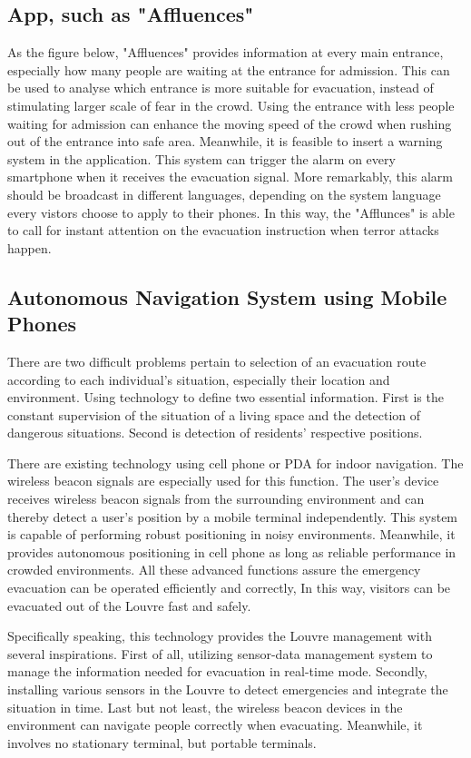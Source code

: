 \documentclass{mcmthesis}
\begin{document}
\subsection{App, such as "Affluences"}
		As the figure below, "Affluences" provides information at every main entrance, especially how many people are waiting at the entrance for admission.  This can be used to analyse which entrance is more suitable for evacuation, instead of stimulating larger scale of fear in the crowd. Using the entrance with less people waiting for admission can enhance the moving speed of the crowd when rushing out of the entrance into safe area.
		Meanwhile, it is feasible to insert a warning system in the application. This system can trigger the alarm on every smartphone when it receives the evacuation signal. More remarkably, this alarm should be broadcast in different languages, depending on the system language every vistors choose to apply to their phones. In this way, the "Afflunces" is able to call for instant attention on the evacuation instruction when terror attacks happen.
	
\subsection{Autonomous Navigation System using Mobile Phones}

There are two difficult problems pertain to selection of an evacuation route according to each individual's situation, especially their location and environment. Using technology to define two essential information. First is the constant supervision of the situation of a living space and the detection of dangerous situations. Second is detection of residents' respective positions.

There are existing technology using cell phone or PDA for indoor navigation. The wireless beacon signals are especially used for this function. The user's device receives wireless beacon signals from the surrounding environment and can thereby detect a user's position by a mobile terminal independently. This system is capable of performing robust positioning in noisy environments. Meanwhile, it provides autonomous positioning in cell phone as long as reliable performance in crowded environments. All these advanced functions assure the emergency evacuation can be operated efficiently and correctly, In this way, visitors can be evacuated out of the Louvre fast and safely.

Specifically speaking, this technology provides the Louvre management with several inspirations. First of all, utilizing sensor-data management system to manage the information needed for evacuation in real-time mode. Secondly, installing various sensors in the Louvre to detect emergencies and integrate the situation in time. Last but not least, the wireless beacon devices in the environment can navigate people correctly when evacuating. Meanwhile, it involves no stationary terminal, but portable terminals.
\end{document}
